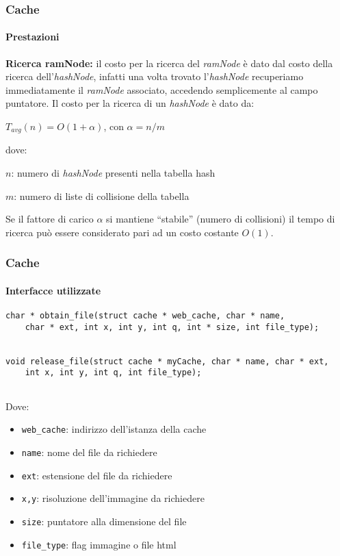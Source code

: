 \documentclass{beamer}
\begin{document}
\begin{frame}
\frametitle{Cache}
\framesubtitle{Prestazioni}
\textbf{Ricerca ramNode:} il costo per la ricerca del \textit{ramNode} è dato dal costo della ricerca
dell'\textit{hashNode}, infatti una volta trovato l'\textit{hashNode} recuperiamo
immediatamente il \textit{ramNode} associato, accedendo semplicemente al
campo puntatore. Il costo per la ricerca di un \textit{hashNode} è dato da:

\begin{center}
$T_{avg}(n) = O(1+\alpha)$, con $\alpha = n/m$
\end{center}


dove:

\medskip

$n$: numero di \textit{hashNode} presenti nella tabella hash

$m$: numero di liste di collisione della tabella

\medskip

Se il fattore di carico $\alpha$ si mantiene ``stabile'' (numero di collisioni) il tempo di ricerca può essere considerato
pari ad un costo costante $O(1)$.

\end{frame}

\begin{frame}[fragile]
\frametitle{Cache}
\framesubtitle{Interfacce utilizzate}

\tiny
\begin{lstlisting}
char * obtain_file(struct cache * web_cache, char * name,
	char * ext, int x, int y, int q, int * size, int file_type);
	
	
void release_file(struct cache * myCache, char * name, char * ext,
	int x, int y, int q, int file_type);
	
\end{lstlisting}
\normalsize

Dove:

\begin{itemize} 

\item \texttt{web\_cache}: indirizzo dell'istanza della cache

\item \texttt{name}: nome del file da richiedere

\item \texttt{ext}: estensione del file da richiedere

\item \texttt{x,y}: risoluzione dell'immagine da richiedere

\item \texttt{size}: puntatore alla dimensione del file

\item \texttt{file\_type}: flag immagine o file html


\end{itemize}





\end{frame}
\end{document}
